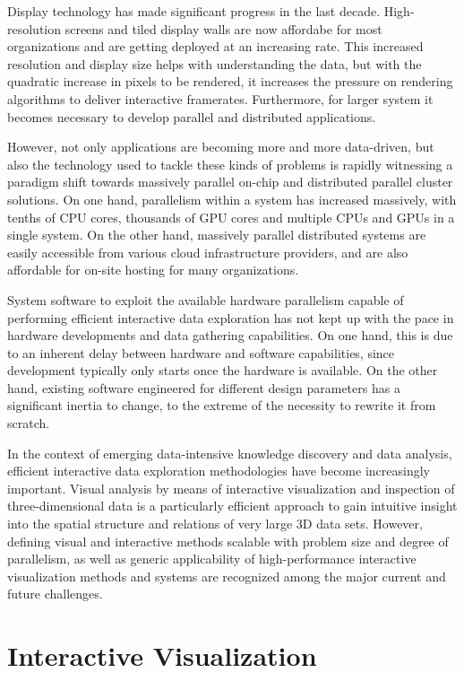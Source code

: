 Display technology has made significant progress in the last decade.
High-resolution screens and tiled display walls are now affordabe for most
organizations and are getting deployed at an increasing rate. This increased
resolution and display size helps with understanding the data, but with the
quadratic increase in pixels to be rendered, it increases the pressure on
rendering algorithms to deliver interactive framerates. Furthermore, for larger
system it becomes necessary to develop parallel and distributed applications.

However, not only applications are becoming more and more data-driven, but also
the technology used to tackle these kinds of problems is rapidly witnessing a
paradigm shift towards massively parallel on-chip and distributed parallel
cluster solutions. On one hand, parallelism within a system has increased
massively, with tenths of CPU cores, thousands of GPU cores and multiple CPUs
and GPUs in a single system. On the other hand, massively parallel distributed
systems are easily accessible from various cloud infrastructure providers, and
are also affordable for on-site hosting for many organizations.

System software to exploit the available hardware parallelism capable of
performing efficient interactive data exploration has not kept up with the pace
in hardware developments and data gathering capabilities. On one hand, this is
due to an inherent delay between hardware and software capabilities, since
development typically only starts once the hardware is available. On the other
hand, existing software engineered for different design parameters has a
significant inertia to change, to the extreme of the necessity to rewrite it
from scratch.

In the context of emerging data-intensive knowledge discovery and data analysis,
efficient interactive data exploration methodologies have become increasingly
important. Visual analysis by means of interactive visualization and inspection
of three-dimensional data is a particularly efficient approach to gain intuitive
insight into the spatial structure and relations of very large 3D data sets.
However, defining visual and interactive methods scalable with problem size and
degree of parallelism, as well as generic applicability of high-performance
interactive visualization methods and systems are recognized among the major
current and future challenges.

\section{Interactive Visualization}

